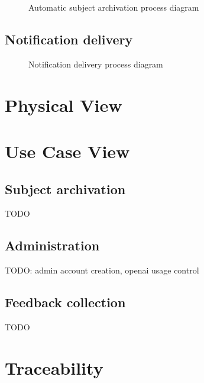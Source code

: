 \documentclass[
    english, %
]{VUMIFPSkursinis}
\begin{document}
\begin{figure}[ht]
    \centering
    
    \caption{Automatic subject archivation process diagram}
    \label{automatic-archivation-process}
\end{figure}

\subsection{Notification delivery}

\begin{figure}[ht]
    \centering
    
    \caption{Notification delivery process diagram}
    \label{notification-process}
\end{figure}

\section{Physical View}

\section{Use Case View}

\subsection{Subject archivation}

TODO

\subsection{Administration}

TODO: admin account creation, openai usage control


\subsection{Feedback collection}

TODO

\section{Traceability}

\newlength{\tablewidth}
\setlength{\tablewidth}{0.5\textwidth}
\end{document}
